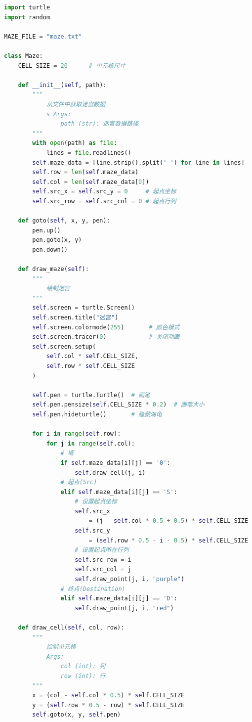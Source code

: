 \begin{lstlisting}[language=Python, title=maze.txt]
import turtle
import random

MAZE_FILE = "maze.txt"

class Maze:
    CELL_SIZE = 20      # 单元格尺寸

    def __init__(self, path):
        """
            从文件中获取迷宫数据
            s Args:
                path (str): 迷宫数据路径
        """
        with open(path) as file:
            lines = file.readlines()
        self.maze_data = [line.strip().split(' ') for line in lines]
        self.row = len(self.maze_data)
        self.col = len(self.maze_data[0])
        self.src_x = self.src_y = 0     # 起点坐标
        self.src_row = self.src_col = 0 # 起点行列
    
    def goto(self, x, y, pen):
        pen.up()
        pen.goto(x, y)
        pen.down()

    def draw_maze(self):
        """
            绘制迷宫
        """
        self.screen = turtle.Screen()
        self.screen.title("迷宫")
        self.screen.colormode(255)       # 颜色模式
        self.screen.tracer(0)            # 关闭动画
        self.screen.setup(
            self.col * self.CELL_SIZE, 
            self.row * self.CELL_SIZE
        )

        self.pen = turtle.Turtle()  # 画笔
        self.pen.pensize(self.CELL_SIZE * 0.2)  # 画笔大小
        self.pen.hideturtle()       # 隐藏海龟

        for i in range(self.row):
            for j in range(self.col):
                # 墙
                if self.maze_data[i][j] == '0':
                    self.draw_cell(j, i)
                # 起点(Src)
                elif self.maze_data[i][j] == 'S':
                    # 设置起点坐标
                    self.src_x 
                        = (j - self.col * 0.5 + 0.5) * self.CELL_SIZE
                    self.src_y 
                        = (self.row * 0.5 - i - 0.5) * self.CELL_SIZE
                    # 设置起点所在行列
                    self.src_row = i
                    self.src_col = j
                    self.draw_point(j, i, "purple")
                # 终点(Destination)
                elif self.maze_data[i][j] == 'D':
                    self.draw_point(j, i, "red")
        
    def draw_cell(self, col, row):
        """
            绘制单元格
            Args:
                col (int): 列
                row (int): 行
        """
        x = (col - self.col * 0.5) * self.CELL_SIZE
        y = (self.row * 0.5 - row) * self.CELL_SIZE
        self.goto(x, y, self.pen)


\end{lstlisting}
